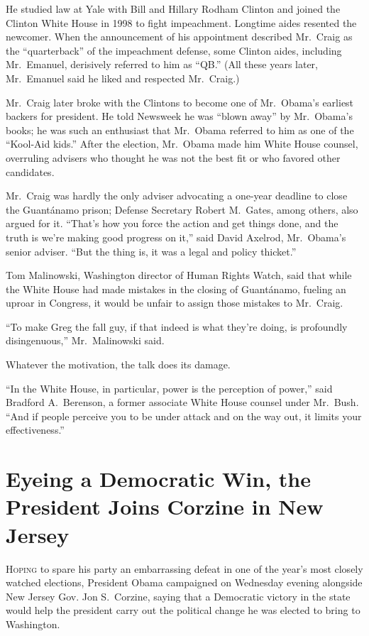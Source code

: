 ﻿\documentclass[12pt]{article}
\begin{document}
He studied law at Yale with Bill and Hillary Rodham Clinton and joined the Clinton White House in
1998 to fight impeachment. Longtime aides resented\cite{resent} the newcomer. When the announcement
of his appointment described Mr.~Craig as the ``quarterback'' of the impeachment\cite{impeachment}
defense, some Clinton aides, including Mr.~Emanuel, derisively referred to him as ``QB.'' (All these
years later, Mr.~Emanuel said he liked and respected Mr.~Craig.)

Mr.~Craig later broke with the Clintons to become one of Mr.~Obama's earliest backers for president.
He told Newsweek he was ``blown away'' by Mr.~Obama's books; he was such an enthusiast that
Mr.~Obama referred to him as one of the ``Kool-Aid kids.'' After the election, Mr.~Obama made him
White House counsel, overruling advisers who thought he was not the best fit or who favored other
candidates.

Mr.~Craig was hardly the only adviser advocating a one-year deadline to close the Guant\'anamo
prison; Defense Secretary Robert M.~Gates, among others, also argued for it. ``That's how you force
the action and get things done, and the truth is we're making good progress on it,'' said David
Axelrod, Mr.~Obama's senior adviser. ``But the thing is, it was a legal and policy thicket.''

Tom Malinowski, Washington director of Human Rights Watch, said that while the White House had made
mistakes in the closing of Guant\'anamo, fueling an uproar in Congress, it would be unfair to assign
those mistakes to Mr.~Craig.

``To make Greg the fall guy, if that indeed is what they're doing, is profoundly disingenuous,''
Mr.~Malinowski said.

Whatever the motivation, the talk does its damage.

``In the White House, in particular, power is the perception of power,'' said Bradford A.~Berenson,
a former associate White House counsel under Mr.~Bush. ``And if people perceive you to be under
attack and on the way out, it limits your effectiveness.''

\section{Eyeing a Democratic Win, the President Joins Corzine in New Jersey}

\lettrine{H}{oping} to spare his party an embarrassing
defeat in one of the year's most closely watched elections, President Obama campaigned on Wednesday
evening alongside New Jersey Gov. Jon S.~Corzine, saying that a Democratic victory in the state
would help the president carry out the political change he was elected to bring to Washington.
\end{document}
